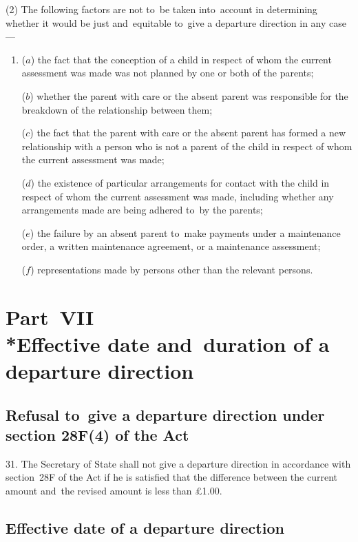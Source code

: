 \documentclass[12pt,a4paper]{article}
\begin{document}
(2) The following factors are not to~be taken into~account in determining
whether it would be just and~equitable to~give a departure direction in any
case—
\begin{enumerate}\item[]
($a$) the fact that the conception of a child in respect of whom the current
assessment was made was not planned by one or both of the parents;

($b$) whether the parent with care or the absent parent was responsible for the
breakdown of the relationship between them;

($c$) the fact that the parent with care or the absent parent has formed a new
relationship with a person who is not a parent of the child in respect of whom
the current assessment was made;

($d$) the existence of particular arrangements for contact with the child in
respect of whom the current assessment was made, including whether any
arrangements made are being adhered to~by the parents;

($e$) the failure by an absent parent to~make payments under a maintenance order, a
written maintenance agreement, or a maintenance assessment;

($f$) representations made by persons other than the relevant persons.
\end{enumerate}

\section[Part~VII --- Effective date and~duration of a departure direction]{Part~VII\\*Effective date and~duration of a departure direction}

\renewcommand\parthead{--- Part~VII}

\subsection[31. Refusal to~give a
departure direction under section~28F(4) of the Act]{\sloppy Refusal to~give a
departure direction under section 28F(4) of the Act}

31. The Secretary of State
shall not give a departure direction in accordance with section~28F of the Act
if he is satisfied that the difference between the current amount and~the
revised amount is less than £1$.$00.

\subsection[32. Effective date of a departure direction]{Effective date of a departure direction}
\end{document}

